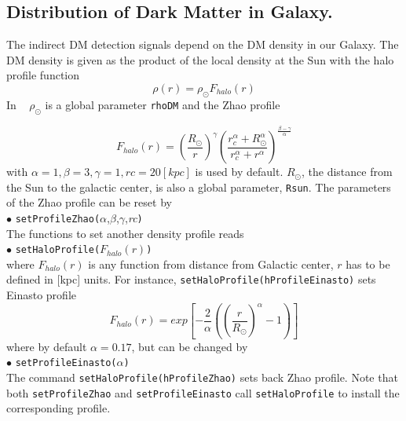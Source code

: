 \documentclass[12pt,a4paper]{article}
\begin{document}
\subsection{Distribution of Dark Matter  in Galaxy.}
The indirect DM detection signals depend on the DM density in our Galaxy.
The DM density is given as the product of the local density at the Sun with the halo profile function 
\begin{equation}
\rho(r)=\rho_\odot F_{halo}(r)
\end{equation}
In \micro~ $\rho_\odot$ is a global parameter {\tt rhoDM} and  the Zhao profile~\cite{Zhao:1995cp}

\begin{equation}
\label{rho}
F_{halo}(r)=\left(\frac{ R_\odot}{r}\right)^{\gamma}
\left(\frac{r_c^{\alpha}+ R_\odot^{\alpha}}
{r_c^{\alpha}+r^{\alpha}}\right)^{\frac{\beta -\gamma}{\alpha}}
\end{equation}
with   $\alpha=1,\beta=3,\gamma=1, rc=20[kpc]$ is used by
default. $R_\odot$, the distance from the Sun to the galactic center,  is also a global parameter, {\tt Rsun}. The parameters of the Zhao profile  can be reset by\\ 
\noindent
$\bullet$ \verb|setProfileZhao(|$\alpha$,$\beta$,$\gamma$,{\it rc}\verb|)|\\
The functions to set another  density profile reads\\ 
\noindent
$\bullet$ \verb|setHaloProfile(|$F_{halo}(r)$\verb|)|\\
where $F_{halo}(r)$ is any function from distance from Galactic center,  $r$
has to    be   defined   in [kpc] units.
For instance, \verb|setHaloProfile(hProfileEinasto)|  sets Einasto profile\\
$$
F_{halo}(r)=exp\left[-\frac{2}{\alpha}\left(\left(\frac{r}{R_\odot}\right)^{\alpha}-1\right)\right]
$$
where by default $\alpha=0.17$,   but can be changed by \\ 
\noindent
$\bullet$ \verb|setProfileEinasto(|$\alpha$\verb|)| \\
The command \verb|setHaloProfile(hProfileZhao)| sets back Zhao profile. Note
that both {\tt setProfileZhao} and {\tt setProfileEinasto} call
{\tt setHaloProfile} to install the corresponding profile. 
\end{document}
